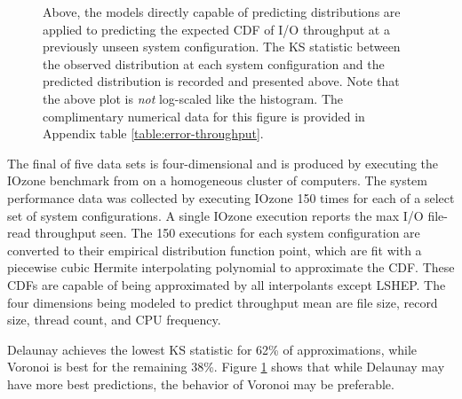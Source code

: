\documentclass[smallextended,final]{svjour3}       %
\begin{document}
\begin{figure}
  \centering
  \caption{Above, the models directly capable of predicting distributions are applied to predicting the expected CDF of I/O throughput at a previously unseen system configuration. The KS statistic between the observed distribution at each system configuration and the predicted distribution is recorded and presented above. Note that the above plot is \textit{not} log-scaled like the histogram. The complimentary numerical data for this figure is provided in Appendix table \ref{table:error-throughput}.}
  \label{fig:error-throughput}
\end{figure}

The final of five data sets is four-dimensional and is produced by executing the IOzone benchmark from \cite{iozone} on a homogeneous cluster of computers. The system performance data was collected by executing IOzone 150 times for each of a select set of system configurations. A single IOzone execution reports the max I/O file-read throughput seen. The 150 executions for each system configuration are converted
to their empirical distribution function point, which are fit with a piecewise cubic Hermite interpolating polynomial \cite{fritsch1980monotone} to approximate the CDF. These CDFs are capable of being approximated by all interpolants except LSHEP. The four dimensions being modeled to predict throughput mean are file size, record size, thread count, and CPU frequency.

Delaunay achieves the lowest KS statistic for 62\% of approximations, while Voronoi is best for the remaining 38\%. Figure \ref{fig:error-throughput} shows that while Delaunay may have more best predictions, the behavior of Voronoi may be preferable.
\end{document}
